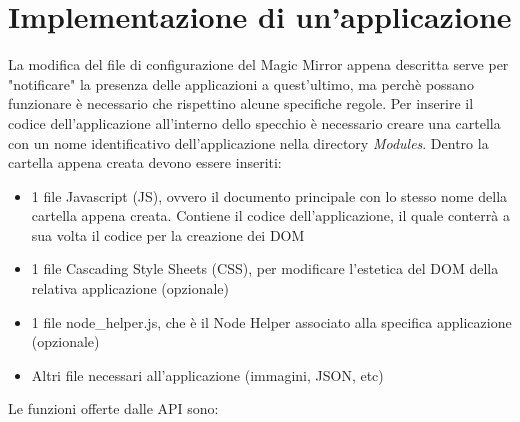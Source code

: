 \section{Implementazione di un'applicazione}
La modifica del file di configurazione del Magic Mirror appena descritta serve per "notificare" la presenza delle applicazioni a quest'ultimo,
ma perch\`e possano funzionare \`e necessario che rispettino alcune specifiche regole.
Per inserire il codice dell'applicazione all'interno dello specchio \`e necessario creare una cartella con un nome identificativo dell'applicazione
nella directory \textit{Modules}.
Dentro la cartella appena creata devono essere inseriti:
\begin{itemize}
\item 1 file Javascript (JS), ovvero il documento principale con lo stesso nome della cartella appena creata. Contiene il codice dell'applicazione, il quale
conterr\`a a sua volta il codice per la creazione dei DOM
\item 1 file Cascading Style Sheets (CSS), per modificare l'estetica del DOM della relativa applicazione (opzionale)
\item 1 file node\_helper.js, che \`e il Node Helper associato alla specifica applicazione (opzionale)
\item Altri file necessari all'applicazione (immagini, JSON, etc)\\[1\baselineskip]
\end{itemize}
\iffalse
Le funzioni offerte dalle API sono:
